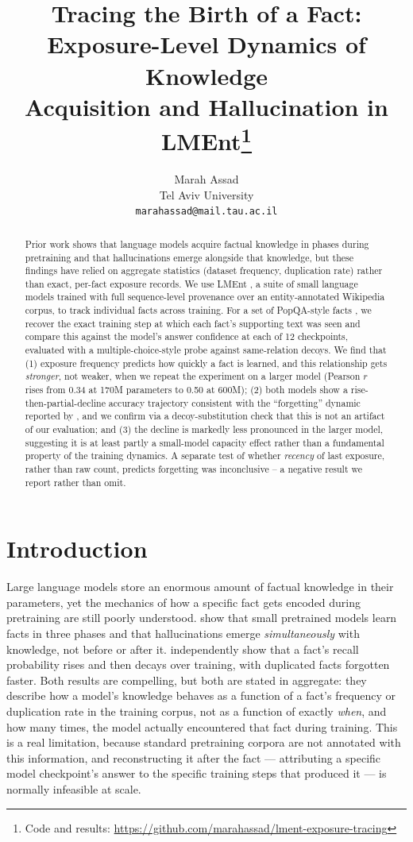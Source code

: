 \documentclass[11pt]{article}
\title{Tracing the Birth of a Fact: Exposure-Level Dynamics of Knowledge \\ Acquisition and Hallucination in LMEnt\footnote{Code and results: \url{https://github.com/marahassad/lment-exposure-tracing}}}
\author{
  Marah Assad \\
  Tel Aviv University \\
  \texttt{marahassad@mail.tau.ac.il}
}
\begin{document}
\maketitle

\begin{abstract}
Prior work shows that language models acquire factual knowledge in phases during pretraining and that hallucinations emerge alongside that knowledge, but these findings have relied on aggregate statistics (dataset frequency, duplication rate) rather than exact, per-fact exposure records. We use LMEnt \citep{gottesman2025lment}, a suite of small language models trained with full sequence-level provenance over an entity-annotated Wikipedia corpus, to track individual facts across training. For a set of PopQA-style facts \citep{mallen2023whennot}, we recover the exact training step at which each fact's supporting text was seen and compare this against the model's answer confidence at each of 12 checkpoints, evaluated with a multiple-choice-style probe against same-relation decoys. We find that (1) exposure frequency predicts how quickly a fact is learned, and this relationship gets \emph{stronger}, not weaker, when we repeat the experiment on a larger model (Pearson $r$ rises from 0.34 at 170M parameters to 0.50 at 600M); (2) both models show a rise-then-partial-decline accuracy trajectory consistent with the ``forgetting'' dynamic reported by \citet{chang2024howdo}, and we confirm via a decoy-substitution check that this is not an artifact of our evaluation; and (3) the decline is markedly less pronounced in the larger model, suggesting it is at least partly a small-model capacity effect rather than a fundamental property of the training dynamics. A separate test of whether \emph{recency} of last exposure, rather than raw count, predicts forgetting was inconclusive -- a negative result we report rather than omit.
\end{abstract}

\section{Introduction}

Large language models store an enormous amount of factual knowledge in their parameters, yet the mechanics of how a specific fact gets encoded during pretraining are still poorly understood. \citet{zucchet2025howdo} show that small pretrained models learn facts in three phases and that hallucinations emerge \emph{simultaneously} with knowledge, not before or after it. \citet{chang2024howdo} independently show that a fact's recall probability rises and then decays over training, with duplicated facts forgotten faster. Both results are compelling, but both are stated in aggregate: they describe how a model's knowledge behaves as a function of a fact's frequency or duplication rate in the training corpus, not as a function of exactly \emph{when}, and how many times, the model actually encountered that fact during training. This is a real limitation, because standard pretraining corpora are not annotated with this information, and reconstructing it after the fact --- attributing a specific model checkpoint's answer to the specific training steps that produced it --- is normally infeasible at scale.
\end{document}
